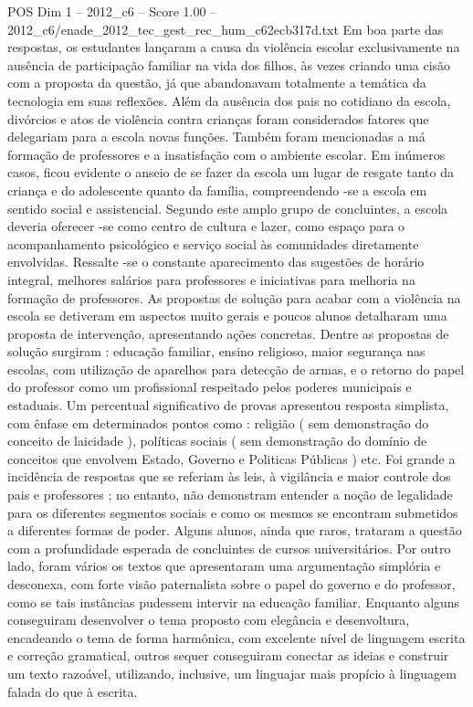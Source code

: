 \begin{textsample}{POS Dim 1 – 2012\_c6 – Score 1.00 – 2012\_c6/enade\_2012\_tec\_gest\_rec\_hum\_c62ecb317d.txt}
Em boa parte das respostas, os estudantes lançaram a causa da violência escolar exclusivamente na ausência de participação familiar na vida dos filhos, às vezes criando uma cisão com a proposta da questão, já que abandonavam totalmente a temática da tecnologia em suas reflexões.
Além da ausência dos pais no cotidiano da escola, divórcios e atos de violência contra crianças foram considerados fatores que delegariam para a escola novas funções.
Também foram mencionadas a má formação de professores e a insatisfação com o ambiente escolar.
Em inúmeros casos, ficou evidente o anseio de se fazer da escola um lugar de resgate tanto da criança e do adolescente quanto da família, compreendendo -se a escola em sentido social e assistencial.
Segundo este amplo grupo de concluintes, a escola deveria oferecer -se como centro de cultura e lazer, como espaço para o acompanhamento psicológico e serviço social às comunidades diretamente envolvidas.
Ressalte -se o constante aparecimento das sugestões de horário integral, melhores salários para professores e iniciativas para melhoria na formação de professores.
As propostas de solução para acabar com a violência na escola se detiveram em aspectos muito gerais e poucos alunos detalharam uma proposta de intervenção, apresentando ações concretas.
Dentre as propostas de solução surgiram : educação familiar, ensino religioso, maior segurança nas escolas, com utilização de aparelhos para detecção de armas, e o retorno do papel do professor como um profissional respeitado pelos poderes municipais e estaduais.
Um percentual significativo de provas apresentou resposta simplista, com ênfase em determinados pontos como : religião ( sem demonstração do conceito de laicidade ), políticas sociais ( sem demonstração do domínio de conceitos que envolvem Estado, Governo e Politicas Públicas ) etc.
Foi grande a incidência de respostas que se referiam às leis, à vigilância e maior controle dos pais e professores ; no entanto, não demonstram entender a noção de legalidade para os diferentes segmentos sociais e como os mesmos se encontram submetidos a diferentes formas de poder.
Alguns alunos, ainda que raros, trataram a questão com a profundidade esperada de concluintes de cursos universitários.
Por outro lado, foram vários os textos que apresentaram uma argumentação simplória e desconexa, com forte visão paternalista sobre o papel do governo e do professor, como se tais instâncias pudessem intervir na educação familiar.
Enquanto alguns conseguiram desenvolver o tema proposto com elegância e desenvoltura, encadeando o tema de forma harmônica, com excelente nível de linguagem escrita e correção gramatical, outros sequer conseguiram conectar as ideias e construir um texto razoável, utilizando, inclusive, um linguajar mais propício à linguagem falada do que à escrita.

\end{textsample}

